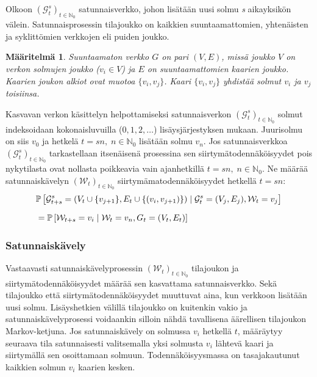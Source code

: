 \documentclass[finnish, 12pt, a4paper, sci, utf8, pdfa]{aaltothesis}
\newcommand{\N}{\mathbb{N}}
\newcommand{\Grandom}{\mathcal{G}}
\newcommand{\Wrandom}{\mathcal{W}}
\newcommand*{\prob}{\mathbb{P}}
\newtheorem{definition}{Määritelmä}
\begin{document}
Olkoon \( (\Grandom_{t}^{s})_{t \in \N_{0}} \) satunnaisverkko, johon lisätään uusi solmu \textit{s} aikayksikön välein. Satunnaisprosessin tilajoukko on kaikkien suuntaamattomien, yhtenäisten ja syklittömien verkkojen eli puiden joukko.
\begin{definition}
   \label{definition:verkko}
Suuntaamaton verkko $ G $ on pari $ (V, E) $, missä joukko $ V $ on verkon solmujen joukko (\( v_{i} \in V \)) ja $ E $ on suuntaamattomien kaarien joukko. Kaarien joukon alkiot ovat muotoa \( \{ v_{i}, v_{j} \} \). Kaari \( \{ v_{i}, v_{j} \} \) yhdistää solmut \( v_{i} \) ja \( v_{j} \) toisiinsa. 
\end{definition}
Kasvavan verkon käsittelyn helpottamiseksi satunnaisverkon \( (\Grandom_{t}^{s})_{t \in \N_{0}} \) solmut indeksoidaan kokonaisluvuilla (\( 0, 1, 2, \ldots \)) lisäysjärjestyksen mukaan. Juurisolmu on siis \( v_{0} \) ja hetkelä \( t = sn, \; n \in \N_{0} \) lisätään solmu \( v_{n} \). Jos satunnaisverkkoa \( (\Grandom_{t}^{s})_{t \in \N_{0}} \) tarkastellaan itsenäisenä prosessina sen siirtymätodennäköisyydet pois nykytilasta ovat nollasta poikkeavia vain ajanhetkillä \( t = sn, \; n \in \N_{0} \). Ne määrää satunnaiskävelyn \( (\Wrandom_{t})_{t \in \N_{0}} \) siirtymämatodennäköisyydet hetkellä \( t = sn \):
\begin{equation}
   \setlength{\jot}{10pt}
   \begin{aligned}
   & \prob \left[ \Grandom_{t+s}^{s} = (V_{t} \cup \{ v_{j + 1} \}, E_{t} \cup \{ (v_{i}, v_{j + 1}) \}) \mid \Grandom_{t}^{s} = (V_{j}, E_{j}), \Wrandom_{t} = v_{j} \right] \\
   &= \prob \left[ \Wrandom_{t+s} = v_{i} \mid \Wrandom_{t} = v_{n}, G_{t} = (V_{t}, E_{t}) \right]
   \end{aligned}
\end{equation}

\subsubsection{Satunnaiskävely}

Vastaavasti satunnaiskävelyprosessin \( (\Wrandom_{t})_{t \in \N_{0}} \) tilajoukon ja siirtymätodennäköisyydet määrää sen kasvattama satunnaisverkko. Sekä tilajoukko että siirtymätodennäköisyydet muuttuvat aina, kun verkkoon lisätään uusi solmu. Lisäyshetkien välillä tilajoukko on kuitenkin vakio ja satunnaiskävelyprosessi voidaankin silloin nähdä tavallisena äärellisen tilajoukon Markov-ketjuna. Jos satunnaiskävely on solmussa \( v_{i} \) hetkellä \( t \), määräytyy seuraava tila satunnaisesti valitsemalla yksi solmusta \( v_{i} \) lähtevä kaari ja siirtymällä sen osoittamaan solmuun. Todennäköisyysmassa on tasajakautunut kaikkien solmun \( v_{i} \) kaarien kesken. 
\end{document}
